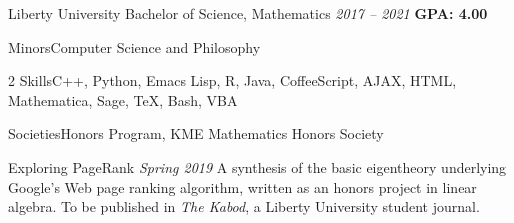 \documentclass{awesome-cv}
\newcommand*{\lmr}{\fontfamily{lmr}\selectfont}
\renewcommand*{\bodyfont}{\lmr}
\newcommand{\bodyfontsize}{\fontsize{11.5pt}{1em}}
\renewcommand*{\entrydatestyle}[1]{{\bodyfontsize\bodyfont\slshape\color{graytext} #1}}
\begin{document}
\makecvheader[L]



\begin{cventries}
  \cventry
  {Liberty University}
  {Bachelor of Science, Mathematics}
  {\entrydatestyle{2017 -- 2021}}
  {\textbf{GPA: 4.00}}
  {
    \begin{cvlabeleditems}
    \item{Minors}{Computer Science and Philosophy}
    \item[2]{Skills}{C++, Python, Emacs Lisp, R, Java, CoffeeScript, AJAX, HTML,
        Mathematica, Sage, \TeX{}, Bash, VBA}
    \item{Societies}{Honors Program, KME Mathematics Honors Society}
    \end{cvlabeleditems}
  }
\end{cventries}



\begin{cventries}
  \cventry
  {Exploring PageRank}
  {}
  {\entrydatestyle{Spring 2019}}
  {}
  {
    A synthesis of the basic eigentheory underlying Google's Web
    page ranking algorithm, written as an honors project in linear algebra. To
    be published in \textit{The Kabod}, a Liberty University student journal.
  }
\end{cventries}


\end{document}
